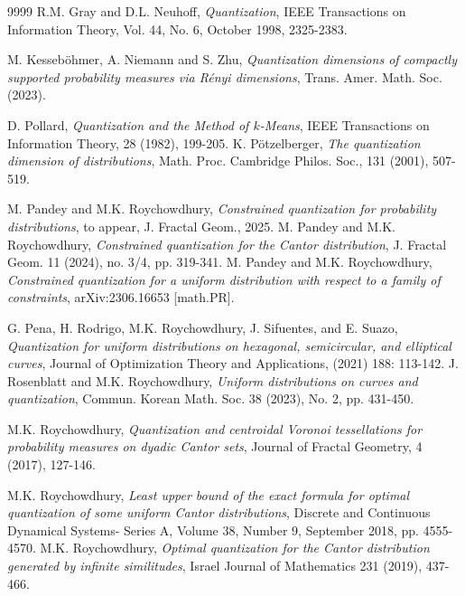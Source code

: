 \documentclass[12pt, reqno]{amsart}
\theoremstyle{plain}
\theoremstyle{definition}
\begin{document}
\begin{thebibliography}{9999}
   R.M. Gray and D.L. Neuhoff, \emph{Quantization}, IEEE Transactions on Information Theory, Vol. 44, No. 6, October 1998, 2325-2383.

%


  M. Kesseb\"ohmer, A. Niemann and S. Zhu, \emph{Quantization dimensions of compactly supported probability measures via R\'enyi dimensions}, Trans. Amer. Math. Soc. (2023). 

 D. Pollard, \emph{Quantization and the Method of $k$-Means}, IEEE Transactions on Information Theory, 28 (1982), 199-205.
   K. P\"otzelberger, \emph{The quantization dimension of distributions}, Math. Proc. Cambridge Philos. Soc., 131 (2001), 507-519.

 M. Pandey and M.K. Roychowdhury, \emph{Constrained quantization for probability distributions}, to appear, J. Fractal Geom., 2025. 
 M. Pandey and M.K. Roychowdhury, \emph{Constrained quantization for the Cantor distribution}, J. Fractal Geom. 11 (2024), no. 3/4, pp. 319-341.
 M. Pandey and M.K. Roychowdhury, \emph{Constrained quantization for a uniform distribution with respect to a family of constraints}, arXiv:2306.16653 [math.PR].


 G. Pena, H. Rodrigo, M.K. Roychowdhury, J. Sifuentes, and E. Suazo, \emph{Quantization for uniform distributions on hexagonal, semicircular, and elliptical curves},  Journal of Optimization Theory and Applications,  (2021) 188: 113-142.
 J. Rosenblatt and M.K. Roychowdhury, \emph{Uniform distributions on curves and quantization}, Commun. Korean Math. Soc. 38 (2023), No. 2, pp. 431-450.


 M.K. Roychowdhury, \emph{Quantization and centroidal Voronoi tessellations for probability measures on dyadic Cantor sets}, Journal of Fractal Geometry, 4 (2017), 127-146.

 M.K. Roychowdhury, \emph{Least upper bound of the exact formula for optimal quantization of some uniform Cantor distributions}, Discrete and Continuous Dynamical Systems- Series A, Volume 38, Number 9, September 2018, pp. 4555-4570.
 M.K. Roychowdhury, \emph{Optimal quantization for the Cantor distribution generated by infinite similitudes}, Israel Journal of Mathematics 231 (2019), 437-466.


\end{thebibliography}
\end{document}
